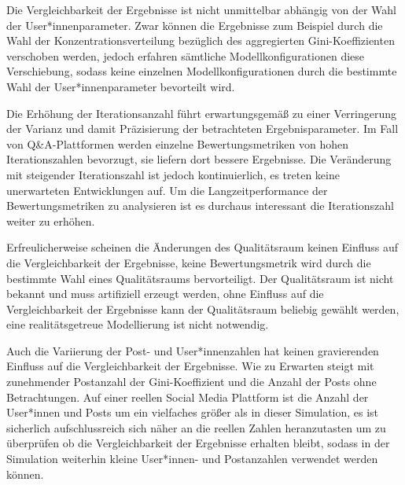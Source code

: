 Die Vergleichbarkeit der Ergebnisse ist nicht unmittelbar abhängig von der Wahl der User*innenparameter. Zwar können die Ergebnisse zum Beispiel durch die Wahl der Konzentrationsverteilung bezüglich des aggregierten Gini-Koeffizienten verschoben werden, jedoch erfahren sämtliche Modellkonfigurationen diese Verschiebung, sodass keine einzelnen Modellkonfigurationen durch die bestimmte Wahl der User*innenparameter bevorteilt wird.

Die Erhöhung der Iterationsanzahl führt erwartungsgemäß zu einer Verringerung der Varianz und damit Präzisierung der betrachteten Ergebnisparameter. Im Fall von Q\&A-Plattformen werden einzelne Bewertungsmetriken von hohen Iterationszahlen bevorzugt, sie liefern dort bessere Ergebnisse. Die Veränderung mit steigender Iterationszahl ist jedoch kontinuierlich, es treten keine unerwarteten Entwicklungen auf. Um die Langzeitperformance der Bewertungsmetriken zu analysieren ist es durchaus interessant die Iterationszahl weiter zu erhöhen.

Erfreulicherweise scheinen die Änderungen des Qualitätsraum keinen Einfluss auf die Vergleichbarkeit der Ergebnisse, keine Bewertungsmetrik wird durch die bestimmte Wahl eines Qualitätsraums bervorteiligt. Der Qualitätsraum ist nicht bekannt und muss artifiziell erzeugt werden, ohne Einfluss auf die Vergleichbarkeit der Ergebnisse kann der Qualitätsraum beliebig gewählt werden, eine realitätsgetreue Modellierung ist nicht notwendig.

Auch die Variierung der Post- und User*innenzahlen hat keinen gravierenden Einfluss auf die Vergleichbarkeit der Ergebnisse. Wie zu Erwarten steigt mit zunehmender Postanzahl der Gini-Koeffizient und die Anzahl der Posts ohne Betrachtungen. Auf einer reellen Social Media Plattform ist die Anzahl der User*innen und Posts um ein vielfaches größer als in dieser Simulation, es ist sicherlich aufschlussreich sich näher an die reellen Zahlen heranzutasten um zu überprüfen ob die Vergleichbarkeit der Ergebnisse erhalten bleibt, sodass in der Simulation weiterhin kleine User*innen- und Postanzahlen verwendet werden können.